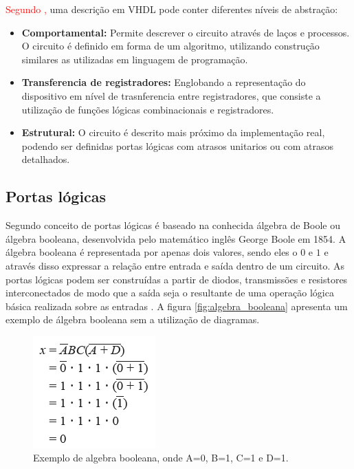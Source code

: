 \par
\textcolor{red}{Segundo \cite{cappelattipraticando},} uma descrição em VHDL pode conter diferentes níveis de abstração:
\begin{itemize}
  \item \textbf{Comportamental:} Permite descrever o circuito através de laços e processos. O circuito é definido em forma de um algoritmo, utilizando construção similares as utilizadas em linguagem de programação.
  
  \item \textbf{Transferencia de registradores:} Englobando a representação do dispositivo em nível de trasnferencia entre registradores, que consiste a utilização de funções lógicas combinacionais e registradores.
  
  \item \textbf{Estrutural:} O circuito é descrito mais próximo da implementação real, podendo ser definidas portas lógicas com atrasos unitarios ou com atrasos detalhados.
\end{itemize}


\subsection{Portas lógicas}

Segundo \citeauthor{idoeta1982elementos} conceito de portas lógicas é baseado na conhecida álgebra de Boole ou álgebra booleana, desenvolvida pelo matemático inglês George Boole em 1854. A álgebra booleana é representada por apenas dois valores, sendo eles o $0$ e $1$ e através disso expressar a relação entre entrada e saída dentro de um circuito. As portas lógicas podem ser construídas a partir de diodos, transmissões e resistores interconectados de modo que a saída seja o resultante de uma operação lógica básica realizada sobre as entradas \cite{tocci2003sistemas}. A figura \autoref{fig:algebra_booleana} apresenta um exemplo de álgebra booleana sem a utilização de diagramas.

\begin{figure}[htb]
	\begin{center}
    \caption{\label{fig:algebra_booleana}Exemplo de algebra booleana, onde A=0, B=1, C=1 e D=1.}
	\includegraphics[scale=0.70]{Figuras/algebra_booleana.png}
	\end{center}
\end{figure}

